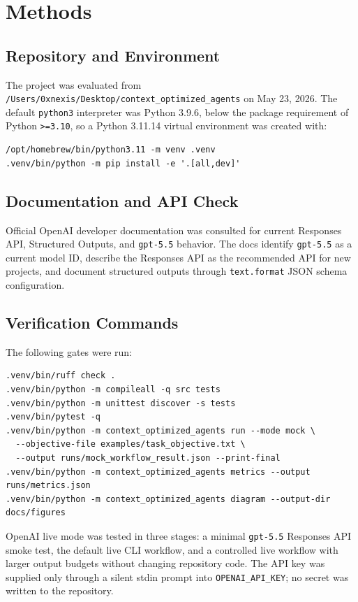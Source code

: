 \documentclass[11pt]{article}
\begin{document}
\section{Methods}

\subsection{Repository and Environment}

The project was evaluated from \texttt{/Users/0xnexis/Desktop/context\_optimized\_agents} on May 23, 2026. The default \texttt{python3} interpreter was Python 3.9.6, below the package requirement of Python \texttt{>=3.10}, so a Python 3.11.14 virtual environment was created with:

\begin{verbatim}
/opt/homebrew/bin/python3.11 -m venv .venv
.venv/bin/python -m pip install -e '.[all,dev]'
\end{verbatim}

\subsection{Documentation and API Check}

Official OpenAI developer documentation was consulted for current Responses API, Structured Outputs, and \texttt{gpt-5.5} behavior. The docs identify \texttt{gpt-5.5} as a current model ID, describe the Responses API as the recommended API for new projects, and document structured outputs through \texttt{text.format} JSON schema configuration.

\subsection{Verification Commands}

The following gates were run:

\begin{verbatim}
.venv/bin/ruff check .
.venv/bin/python -m compileall -q src tests
.venv/bin/python -m unittest discover -s tests
.venv/bin/pytest -q
.venv/bin/python -m context_optimized_agents run --mode mock \
  --objective-file examples/task_objective.txt \
  --output runs/mock_workflow_result.json --print-final
.venv/bin/python -m context_optimized_agents metrics --output runs/metrics.json
.venv/bin/python -m context_optimized_agents diagram --output-dir docs/figures
\end{verbatim}

OpenAI live mode was tested in three stages: a minimal \texttt{gpt-5.5} Responses API smoke test, the default live CLI workflow, and a controlled live workflow with larger output budgets without changing repository code. The API key was supplied only through a silent stdin prompt into \texttt{OPENAI\_API\_KEY}; no secret was written to the repository.
\end{document}
